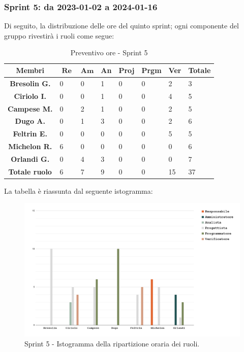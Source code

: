 \documentclass[10pt, a4paper]{article}
\begin{document}
{{{{{{{{{{{{\subsubsection{Sprint 5: da 2023-01-02 a 2024-01-16}
Di seguito, la distribuzione delle ore del quinto sprint; ogni componente del gruppo rivestirà i ruoli come segue:
\begin{table}[H]
    \begin{tabularx}{\textwidth}{c|X|X|X|X|X|X|X}
        \textbf{Membri} & $\operatorname{\textbf{Re}}$ & $\mathrm{\textbf{Am}}$ & \textbf{An} & \textbf{Proj} & \textbf{Prgm} & \textbf{Ver} & \textbf{Totale} \\
        \hline
        \textbf{Bresolin G.} & 0 & 0 & 1 & 0 & 0 & \cellcolor{primarycolor}2 & 3 \\
        \hline
        \textbf{Ciriolo I.}  & 0 & 0 & 1 & 0 & 0 & \cellcolor{primarycolor}4 & 5 \\
        \hline
        \textbf{Campese M.}  & 0 & \cellcolor{primarycolor}2 & 1 & 0 & 0 & 2 & 5 \\
        \hline
        \textbf{Dugo A.}     & 0 & 1 & \cellcolor{primarycolor}3 & 0 & 0 & 2 & 6 \\
        \hline
        \textbf{Feltrin E.}  & 0 & 0 & 0 & 0 & 0 &\cellcolor{primarycolor} 5 & 5 \\
        \hline
        \textbf{Michelon R.} & \cellcolor{primarycolor}6 & 0 & 0 & 0 & 0 & 0 & 6 \\
        \hline
        \textbf{Orlandi G.}  & 0 & 4 & \cellcolor{primarycolor}3 & 0 & 0 & 0 & 7 \\
        \hline
        \textbf{Totale ruolo} & 6 & 7 & 9 & 0 & 0 & 15 & 37 \\
    \end{tabularx}
    \caption{Preventivo ore - Sprint 5}
\end{table}

La tabella è riassunta dal seguente istogramma:
 \begin{figure}[H]
        \centering        
        \includegraphics[width=15.5cm]{istogrammi/istogramma_5_periodo.png}
        \caption{Sprint 5 - Istogramma della ripartizione oraria dei ruoli. }
    \end{figure}

}}}}}}}}}}}}
\end{document}
